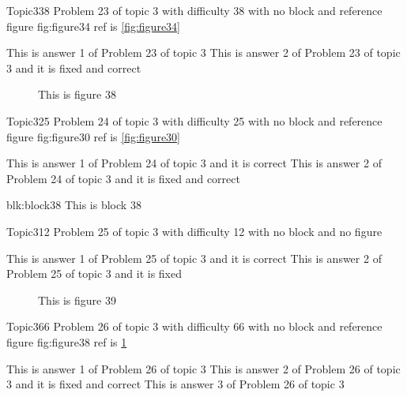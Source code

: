 \documentclass[master]{exam}
\begin{document}
\begin{problem}{Topic3}{38}
	Problem 23 of topic 3 with difficulty 38 with no block and reference figure fig:figure34 ref is \ref{fig:figure34}
	\begin{answers}
		\answer This is answer 1 of Problem 23 of topic 3 
		 This is answer 2 of Problem 23 of topic 3 and it is fixed and correct
	\end{answers}
\end{problem}



\begin{figure}
	\begin{center}
		This is figure 38 
		\label{fig:figure38}
	\end{center}
\end{figure}

\begin{problem}{Topic3}{25}
	Problem 24 of topic 3 with difficulty 25 with no block and reference figure fig:figure30 ref is \ref{fig:figure30}
	\begin{answers}
		\answer[correct] This is answer 1 of Problem 24 of topic 3 and it is correct
		 This is answer 2 of Problem 24 of topic 3 and it is fixed and correct
	\end{answers}
\end{problem}



\begin{block}{blk:block38}
This is block 38
\end{block}


\begin{problem}{Topic3}{12}
	Problem 25 of topic 3 with difficulty 12 with no block and no figure
	\begin{answers}
		\answer[correct] This is answer 1 of Problem 25 of topic 3 and it is correct
		\answer[fixed] This is answer 2 of Problem 25 of topic 3 and it is fixed
	\end{answers}
\end{problem}



\begin{figure}
	\begin{center}
		This is figure 39 
		\label{fig:figure39}
	\end{center}
\end{figure}

\begin{problem}{Topic3}{66}
	Problem 26 of topic 3 with difficulty 66 with no block and reference figure fig:figure38 ref is \ref{fig:figure38}
	\begin{answers}
		\answer This is answer 1 of Problem 26 of topic 3 
		 This is answer 2 of Problem 26 of topic 3 and it is fixed and correct
		\answer This is answer 3 of Problem 26 of topic 3 
	\end{answers}
\end{problem}
\end{document}

